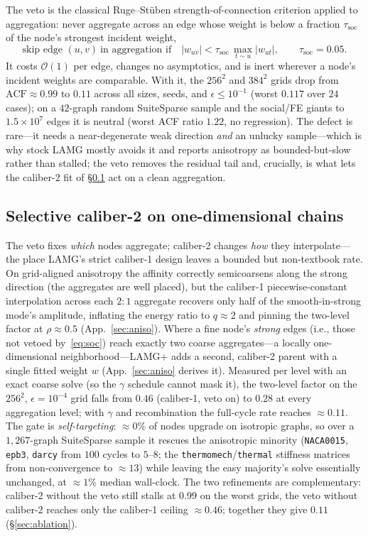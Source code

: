 \documentclass[leqno,letterpaper]{etna}
\newcommand{\Oone}{\mathcal{O}(1)}
\newcommand{\acf}{\mathrm{ACF}}
\begin{document}
The veto is the classical Ruge--St\"uben strength-of-connection criterion \cite{ruge-stuben}
applied to aggregation: never aggregate across an edge whose weight is below a fraction
$\tau_{\mathrm{soc}}$ of the node's strongest incident weight,
\begin{equation}\label{eq:soc}
\text{skip edge }(u,v)\ \text{in aggregation if}\quad |w_{uv}|<\tau_{\mathrm{soc}}\,\max_{t\sim u}|w_{ut}|,
\qquad \tau_{\mathrm{soc}}=0.05 .
\end{equation}
It costs $\Oone$ per edge, changes no asymptotics, and is inert wherever a node's incident
weights are comparable. With it, the $256^2$ and $384^2$ grids drop from $\acf\approx0.99$ to
$0.11$ across all sizes, seeds, and $\epsilon\le10^{-1}$ (worst $0.117$ over $24$ cases); on a
$42$-graph random SuiteSparse sample and the social/FE giants to $1.5\times10^7$ edges it is
neutral (worst ACF ratio $1.22$, no regression). The defect is rare---it needs a near-degenerate
weak direction \emph{and} an unlucky sample---which is why stock LAMG mostly avoids it and
reports anisotropy as bounded-but-slow rather than stalled; the veto removes the residual tail
and, crucially, is what lets the caliber-2 fit of \S\ref{sec:cal2} act on a clean aggregation.

\subsection{Selective caliber-2 on one-dimensional chains}\label{sec:cal2}
The veto fixes \emph{which} nodes aggregate; caliber-2 changes \emph{how} they
interpolate---the place LAMG's strict caliber-1 design leaves a bounded but non-textbook
rate. On grid-aligned anisotropy the affinity correctly semicoarsens along the strong direction
(the aggregates are well placed), but the caliber-1 piecewise-constant interpolation across each
$2{:}1$ aggregate recovers only half of the smooth-in-strong mode's amplitude, inflating the energy ratio to
$q\approx2$ and pinning the two-level factor at $\rho\approx0.5$ (App.~\ref{sec:aniso}). Where a
fine node's \emph{strong} edges (i.e., those not vetoed by~\eqref{eq:soc}) reach exactly two coarse aggregates---a locally one-dimensional
neighborhood---LAMG+ adds a second, caliber-2 parent with a single fitted weight $w$
(App.~\ref{sec:aniso} derives it). Measured per level with an exact coarse solve (so the
$\gamma$ schedule cannot mask it), the two-level factor on the $256^2$, $\epsilon=10^{-4}$ grid
falls from $0.46$ (caliber-1, veto on) to $0.28$ at every aggregation level; with $\gamma$ and
recombination the full-cycle rate reaches $\approx0.11$. The gate is \emph{self-targeting}:
$\approx\!0\%$ of nodes upgrade on isotropic graphs, so over a $1{,}267$-graph SuiteSparse
sample it rescues the anisotropic minority (\texttt{NACA0015}, \texttt{epb3}, \texttt{darcy}
from $100$ cycles to $5$--$8$; the \texttt{thermomech}/\texttt{thermal} stiffness matrices from
non-convergence to $\approx\!13$) while leaving the easy majority's solve essentially unchanged,
at $\approx\!1\%$ median wall-clock. The two refinements are complementary:
caliber-2 without the veto still stalls at $0.99$ on the worst grids, the veto without caliber-2
reaches only the caliber-1 ceiling $\approx0.46$; together they give $0.11$ (\S\ref{sec:ablation}).
\end{document}
